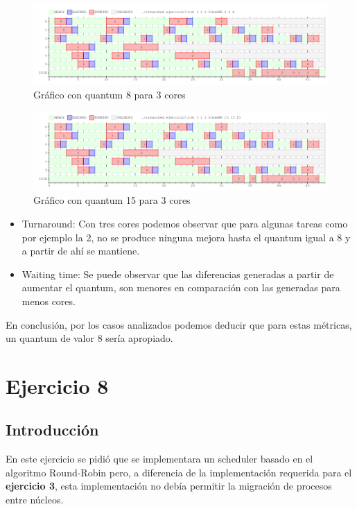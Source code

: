\documentclass[a4paper,11pt]{article}
\begin{document}
\begin{figure}[H]
\centering
\includegraphics[scale=.6, width=1\textwidth]{graficos/ej7-3core-q3}
\caption{Gráfico con quantum 8 para 3 cores}
\end{figure}

\begin{figure}[H]
\centering
\includegraphics[scale=.6, width=1\textwidth]{graficos/ej7-3core-q4}
\caption{Gráfico con quantum 15 para 3 cores}
\end{figure}

\begin{itemize}
\item Turnaround: Con tres cores podemos observar que para algunas tareas como por ejemplo la 2, no se produce ninguna mejora hasta el quantum igual a 8 y a partir de ahí se mantiene.
\item Waiting time: Se puede observar que las diferencias generadas a partir de aumentar el quantum, son menores en comparación con las generadas para menos cores. 
\end{itemize}

En conclusión, por los casos analizados podemos deducir que para estas métricas, un quantum de valor 8 sería apropiado.


\section{Ejercicio 8}
	\subsection{Introducci\'on}
		En este ejercicio se pidió que se implementara un scheduler basado en el algoritmo Round-Robin pero, a diferencia de la implementación requerida para el \textbf{ejercicio 3}, esta implementación no debía permitir la migración de procesos entre núcleos.
		
\end{document}
